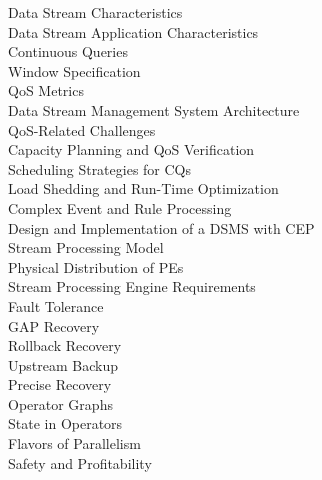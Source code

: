 Data Stream Characteristics\cite{chakravarthy2009stream}\\


Data Stream Application Characteristics\cite{chakravarthy2009stream}\\


Continuous Queries\cite{chakravarthy2009stream}\\


Window Specification\cite{chakravarthy2009stream}\\


QoS Metrics\cite{chakravarthy2009stream}\\


Data Stream Management System Architecture\cite{chakravarthy2009stream}\\


QoS-Related Challenges\cite{chakravarthy2009stream}\\


Capacity Planning and QoS Verification\cite{chakravarthy2009stream}\\


Scheduling Strategies for CQs\cite{chakravarthy2009stream}\\


Load Shedding and Run-Time Optimization\cite{chakravarthy2009stream}\\


Complex Event and Rule Processing\cite{chakravarthy2009stream}\\


Design and Implementation of a DSMS with CEP\cite{chakravarthy2009stream}\\


Stream Processing Model\cite{kamburugamuve2013survey}\\


Physical Distribution of PEs\cite{kamburugamuve2013survey}\\


Stream Processing Engine Requirements\cite{kamburugamuve2013survey}\\


Fault Tolerance\cite{kamburugamuve2013survey}\\


GAP Recovery\cite{kamburugamuve2013survey}\\


Rollback Recovery\cite{kamburugamuve2013survey}\\


Upstream Backup\cite{kamburugamuve2013survey}\\


Precise Recovery\cite{kamburugamuve2013survey}\\



Operator Graphs\cite{schneider2013tutorial}\\


State in Operators\cite{schneider2013tutorial}\\


Flavors of Parallelism\cite{schneider2013tutorial}\\


Safety and Profitability\cite{schneider2013tutorial}\\
